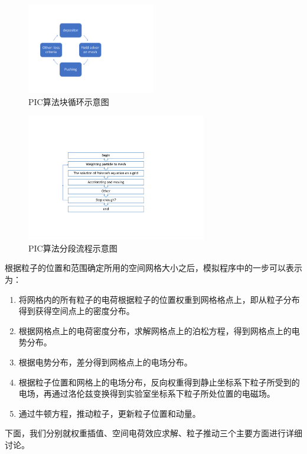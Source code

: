 \begin{figure}[!tbh]
  \centering
    \includegraphics[width=0.5\textwidth]{Img/3_1_PIC.pdf}
    \caption{PIC算法块循环示意图}
    \label{fig:PICflow1}
\end{figure}

\begin{figure}[!tbh]
  \centering
    \includegraphics[width=0.7\textwidth]{Img/3_1_PIC2.pdf}
    \caption{PIC算法分段流程示意图}
    \label{fig:PICflow2}
\end{figure}

根据粒子的位置和范围确定所用的空间网格大小之后，模拟程序中的一步可以表示为：
\begin{enumerate}
  \item 将网格内的所有粒子的电荷根据粒子的位置权重到网格格点上，即从粒子分布得到获得空间点上的密度分布。
  \item 根据网格点上的电荷密度分布，求解网格点上的泊松方程，得到网格点上的电势分布。
  \item 根据电势分布，差分得到网格点上的电场分布。
  \item 根据粒子位置和网格上的电场分布，反向权重得到静止坐标系下粒子所受到的电场，再通过洛伦兹变换得到实验室坐标系下粒子所处位置的电磁场。
  \item 通过牛顿方程，推动粒子，更新粒子位置和动量。
\end{enumerate}

下面，我们分别就权重插值、空间电荷效应求解、粒子推动三个主要方面进行详细讨论。

